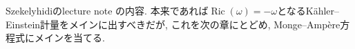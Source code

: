 \documentclass[dvipdfmx,a4paper,11pt]{article} %
\newtheorem{thm}{Theorem}[section]
\theoremstyle{definition}
\theoremstyle{remark}
\numberwithin{equation}{section}
\DeclareMathOperator{\Ric}{Ric}
\newcommand{\underalign}[2]{%
  \quad
  \underset{\mathclap{\raisebox{-1.6ex}{\ensuremath{\scriptstyle #1}}}}{#2}
  \quad
}
\newcommand{\R}{\mathbb{R}}
\begin{document}
Szekelyhidiのlecture note \cite[Chapter 3]{Sze14}の内容. 
本来であれば$\Ric(\omega)=-\omega$となるK\"ahler--Einstein計量をメインに出すべきだが, これを次の章にとどめ, Monge--Amp\`ere方程式にメインを当てる. 

\end{document}
